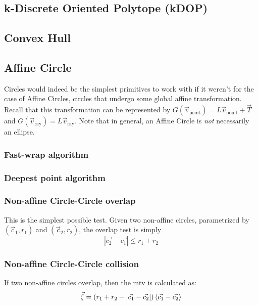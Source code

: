 \documentclass[10pt]{report}
\begin{document}
\subsection{k-Discrete Oriented Polytope (kDOP)}

\subsection{Convex Hull}

\subsection{Affine Circle}
Circles would indeed be the simplest primitives to work with if it weren't for the case of Affine Circles, circles that undergo some global affine transformation. Recall that this transformation can be represented by $G(\vec{v}_{\mbox{point}})=L\vec{v}_{\mbox{point}}+\vec{T}$ and $G(\vec{v}_{\mbox{ray}})=L\vec{v}_{\mbox{ray}}$. Note that in general, an Affine Circle is \textit{not} necessarily an ellipse.

\subsubsection{Fast-wrap algorithm}

\subsubsection{Deepest point algorithm}

\subsubsection{Non-affine Circle-Circle overlap}
This is the simplest possible test. Given two non-affine circles, parametrized by $(\vec{c}_1,r_1)$ and $(\vec{c}_2,r_2)$, the overlap test is simply
\begin{equation}|\vec{c_2}-\vec{c_1}|\leq r_1+r_2\end{equation}

\subsubsection{Non-affine Circle-Circle collision}
If two non-affine circles overlap, then the mtv is calculated as:
\begin{equation}\vec{\zeta}=(r_1+r_2-|\vec{c_1}-\vec{c_2}|)\braket{\vec{c_1}-\vec{c_2}}\end{equation}
\end{document}
